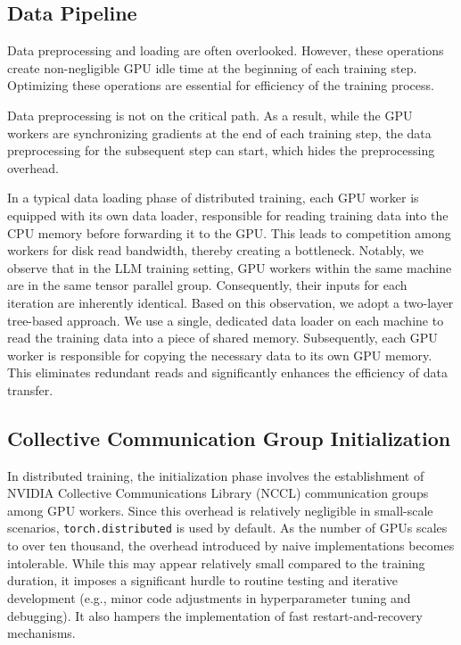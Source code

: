 \subsection{Data Pipeline}
\label{sec:data}

Data preprocessing and loading are often overlooked. However, these operations
create non-negligible GPU idle time at the beginning of each training step.
Optimizing these operations are essential for efficiency of the training
process.

 Data preprocessing is not on the
critical path. As a result, while the GPU workers are synchronizing gradients at
the end of each training step, the data preprocessing for the subsequent step
can start, which hides the preprocessing overhead.


 In a typical data loading phase of
distributed training, each GPU worker is equipped with its own data loader,
responsible for reading training data into the CPU memory before forwarding it
to the GPU. This leads to competition among workers for disk read bandwidth,
thereby creating a bottleneck. Notably, we observe that in the LLM training
setting, GPU workers within the same machine are in the same tensor parallel
group. Consequently, their inputs for each iteration are inherently identical.
Based on this observation, we adopt a two-layer tree-based approach.
We use a single, dedicated data loader on each machine to read the
training data into a piece of shared memory. Subsequently, each GPU worker is
responsible for copying the necessary data to its own GPU memory. This
eliminates redundant reads and significantly enhances the efficiency of data
transfer.


\subsection{Collective Communication Group Initialization}

In distributed training, the initialization phase involves the establishment of
NVIDIA Collective Communications Library (NCCL) communication groups among GPU
workers. Since this overhead is relatively negligible in small-scale scenarios,
\texttt{torch.distributed} is used by default. As the number of GPUs scales to
over ten thousand, the overhead introduced by naive implementations becomes
intolerable.  While this may
appear relatively small compared to the training duration, it imposes a
significant hurdle to routine testing and iterative development (e.g., minor
code adjustments in hyperparameter tuning and debugging). It also hampers
the implementation of fast restart-and-recovery mechanisms.

